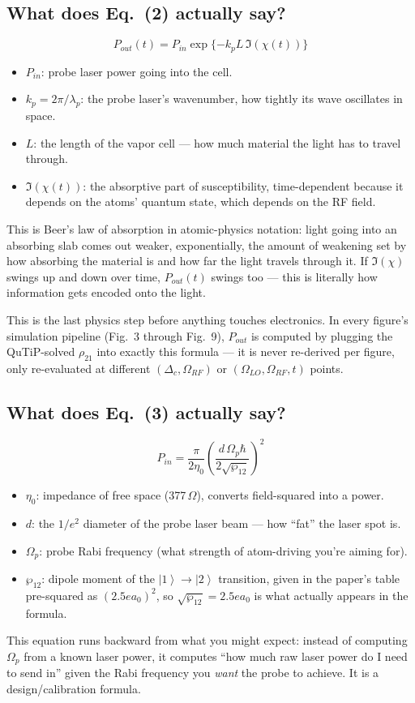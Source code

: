 \documentclass[11pt]{article}
\newcommand{\ket}[1]{\left|#1\right\rangle}
\begin{document}
\subsection*{What does Eq.~(2) actually say?}
\[
P_{out}(t) = P_{in}\exp\{-k_pL\,\Im(\chi(t))\}
\]
\begin{itemize}
\item $P_{in}$: probe laser power going into the cell.
\item $k_p=2\pi/\lambda_p$: the probe laser's wavenumber, how tightly its wave oscillates in space.
\item $L$: the length of the vapor cell --- how much material the light has to travel through.
\item $\Im(\chi(t))$: the absorptive part of susceptibility, time-dependent because it depends on the atoms' quantum state, which depends on the RF field.
\end{itemize}
\begin{eqmeaning}
This is Beer's law of absorption in atomic-physics notation: light going into an absorbing slab comes out weaker, exponentially, the amount of weakening set by how absorbing the material is and how far the light travels through it. If $\Im(\chi)$ swings up and down over time, $P_{out}(t)$ swings too --- this is literally how information gets encoded onto the light.
\end{eqmeaning}
\begin{simuse}
This is the last physics step before anything touches electronics. In every figure's simulation pipeline (Fig.~3 through Fig.~9), $P_{out}$ is computed by plugging the QuTiP-solved $\rho_{21}$ into exactly this formula --- it is never re-derived per figure, only re-evaluated at different $(\Delta_c,\Omega_{RF})$ or $(\Omega_{LO},\Omega_{RF},t)$ points.
\end{simuse}

\subsection*{What does Eq.~(3) actually say?}
\[
P_{in} = \frac{\pi}{2\eta_0}\left(\frac{d\,\Omega_p\hbar}{2\sqrt{\wp_{12}}}\right)^2
\]
\begin{itemize}
\item $\eta_0$: impedance of free space (377\,$\Omega$), converts field-squared into a power.
\item $d$: the $1/e^2$ diameter of the probe laser beam --- how ``fat'' the laser spot is.
\item $\Omega_p$: probe Rabi frequency (what strength of atom-driving you're aiming for).
\item $\wp_{12}$: dipole moment of the $\ket1\to\ket2$ transition, given in the paper's table pre-squared as $(2.5ea_0)^2$, so $\sqrt{\wp_{12}}=2.5ea_0$ is what actually appears in the formula.
\end{itemize}
\begin{eqmeaning}
This equation runs backward from what you might expect: instead of computing $\Omega_p$ from a known laser power, it computes ``how much raw laser power do I need to send in'' given the Rabi frequency you \emph{want} the probe to achieve. It is a design/calibration formula.
\end{eqmeaning}
\end{document}
